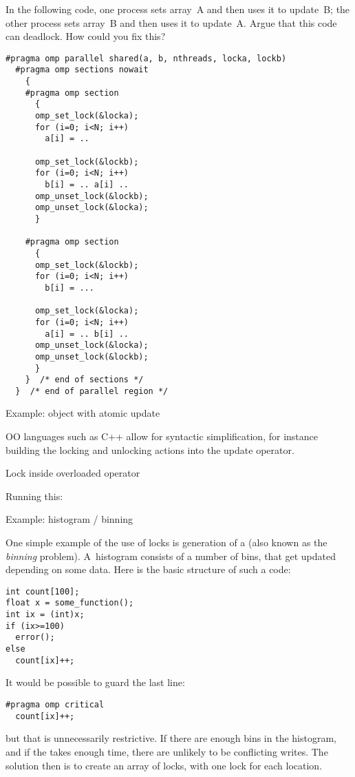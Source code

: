 \begin{exercise}
  \label{ex:loc-deadlock}
  In the following code, one process sets array~A and then uses it to
  update~B; the other process sets array~B and then uses it to
  update~A.
  Argue that this code can deadlock. How could you fix this?
\begin{lstlisting}
#pragma omp parallel shared(a, b, nthreads, locka, lockb)
  #pragma omp sections nowait
    {
    #pragma omp section
      {
      omp_set_lock(&locka);
      for (i=0; i<N; i++)
        a[i] = ..

      omp_set_lock(&lockb);
      for (i=0; i<N; i++)
        b[i] = .. a[i] ..
      omp_unset_lock(&lockb);
      omp_unset_lock(&locka);
      }

    #pragma omp section
      {
      omp_set_lock(&lockb);
      for (i=0; i<N; i++)
        b[i] = ...

      omp_set_lock(&locka);
      for (i=0; i<N; i++)
        a[i] = .. b[i] ..
      omp_unset_lock(&locka);
      omp_unset_lock(&lockb);
      }
    }  /* end of sections */
  }  /* end of parallel region */
\end{lstlisting}
\end{exercise}

 {Example: object with atomic update}

\ac{OO} languages such as C++ allow for syntactic simplification,
for instance building the locking and unlocking actions into
the update operator.

\begin{cppnote}{Lock inside overloaded operator}
  \label{cpp:op-lock}

  Running this:

\end{cppnote}

 {Example: histogram / binning}

One simple example of the use of locks is generation of a 
(also known as the \emph{binning} problem).
A~histogram consists of a number of bins, that get updated depending on some data.
Here is the basic structure of such a code:
\begin{lstlisting}
int count[100];
float x = some_function();
int ix = (int)x;
if (ix>=100)
  error();
else
  count[ix]++;
\end{lstlisting}
It would be possible to guard the last line:
\begin{lstlisting}
#pragma omp critical
  count[ix]++;
\end{lstlisting}
but that is unnecessarily restrictive. If there are enough bins in the
histogram, and if the  takes enough time, there are unlikely to be
conflicting writes. The solution then is to create an array of locks, with
one lock for each  location.

